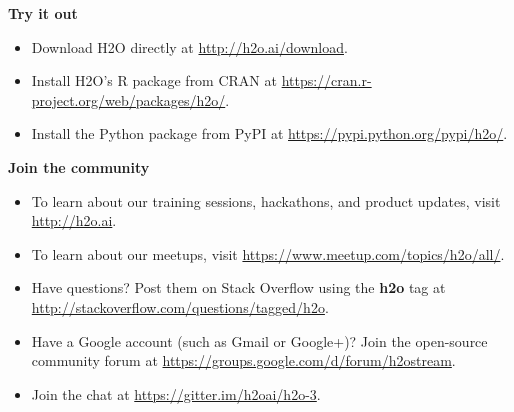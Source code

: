 \documentclass{standalone}
\begin{document}
    \textbf{Try it out}

    \begin{itemize}
        \setlength\itemsep{1pt}
        \item  Download H2O directly at {\url{http://h2o.ai/download}}.
        \item Install H2O's R package from CRAN at {\url{https://cran.r-project.org/web/packages/h2o/}}.
        \item Install the Python package from PyPI at {\url{https://pypi.python.org/pypi/h2o/}}.

    \end{itemize}


    \begin{minipage}{\textwidth}
        \textbf{Join the community}
        \setlength{\parskip}{1em}
        \begin{itemize}
            \setlength\itemsep{1pt}
            \item To learn about our training sessions, hackathons, and product updates, visit {\url{http://h2o.ai}}.
            \item To learn about our meetups, visit {\url{https://www.meetup.com/topics/h2o/all/}}.
            \item Have questions? Post them on Stack Overflow using the \textbf{h2o} tag at {\url{http://stackoverflow.com/questions/tagged/h2o}}.
            \item Have a Google account (such as Gmail or Google+)? Join the open-source community forum at {\url{https://groups.google.com/d/forum/h2ostream}}.
            \item Join the chat at {\url{https://gitter.im/h2oai/h2o-3}}.
        \end{itemize}
    \end{minipage}
\end{document}
